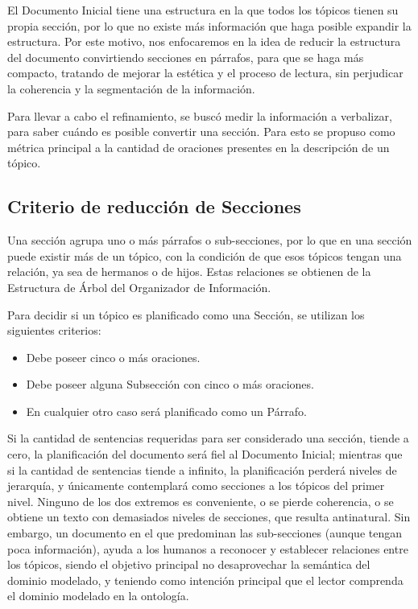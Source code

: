 El Documento Inicial tiene una estructura en la que todos los tópicos tienen su propia sección, por lo que no existe más información que haga posible expandir la estructura. Por este motivo, nos enfocaremos en la idea de reducir la estructura del documento convirtiendo secciones en párrafos, para que se haga más compacto, tratando de mejorar la estética y el proceso de lectura, sin perjudicar la coherencia y la segmentación de la información.

Para llevar a cabo el refinamiento, se buscó medir la información a verbalizar, para saber cuándo es posible convertir una sección. Para esto se propuso como métrica principal a la cantidad de oraciones presentes en la descripción de un tópico.

\subsection{Criterio de reducción de Secciones}
Una sección agrupa uno o más párrafos o sub-secciones, por lo que en una sección puede existir más de un tópico, con la condición de que esos tópicos tengan una relación, ya sea de hermanos o de hijos. Estas relaciones se obtienen de la Estructura de Árbol del Organizador de Información. 

Para decidir si un tópico es planificado como una Sección, se utilizan los siguientes criterios:
\begin{itemize}
    \item Debe poseer cinco o más oraciones.
    \item Debe poseer alguna Subsección con cinco o más oraciones.
    \item En cualquier otro caso será planificado como un Párrafo.
\end{itemize}

Si la cantidad de sentencias requeridas para ser considerado una sección, tiende a cero, la planificación del documento será fiel al Documento Inicial; mientras que si la cantidad de sentencias tiende a infinito, la planificación perderá niveles de jerarquía, y únicamente contemplará como secciones a los tópicos del primer nivel. Ninguno de los dos extremos es conveniente, o se pierde coherencia, o se obtiene un texto con demasiados niveles de secciones, que resulta antinatural. Sin embargo, un documento en el que predominan las sub-secciones (aunque tengan poca información), ayuda a los humanos a reconocer y establecer relaciones entre los tópicos, siendo el objetivo principal no desaprovechar la semántica del dominio modelado, y teniendo como intención principal que el lector comprenda el dominio modelado en la ontología.


